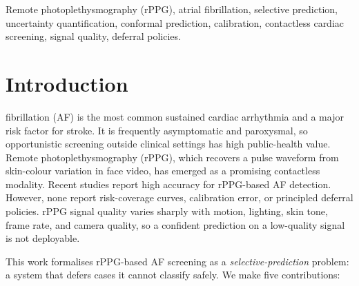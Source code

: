 \documentclass[journal]{IEEEtran}
\begin{document}
\begin{IEEEkeywords}
Remote photoplethysmography (rPPG), atrial fibrillation, selective prediction, uncertainty quantification, conformal prediction, calibration, contactless cardiac screening, signal quality, deferral policies.
\end{IEEEkeywords}

\section{Introduction}
 fibrillation (AF) is the most common sustained cardiac arrhythmia and a major risk factor for stroke. It is frequently asymptomatic and paroxysmal, so opportunistic screening outside clinical settings has high public-health value. Remote photoplethysmography (rPPG), which recovers a pulse waveform from skin-colour variation in face video, has emerged as a promising contactless modality. Recent studies report high accuracy for rPPG-based AF detection. However, none report risk-coverage curves, calibration error, or principled deferral policies. rPPG signal quality varies sharply with motion, lighting, skin tone, frame rate, and camera quality, so a confident prediction on a low-quality signal is not deployable.

This work formalises rPPG-based AF screening as a \emph{selective-prediction} problem: a system that defers cases it cannot classify safely. We make five contributions:
\end{document}
